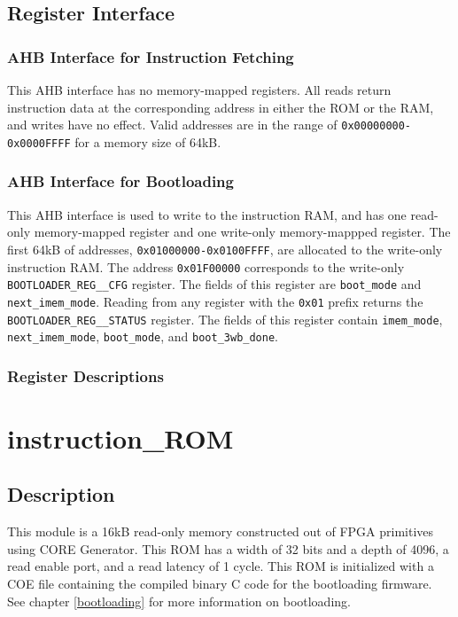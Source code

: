 \subsection{Register Interface}
\subsubsection{AHB Interface for Instruction Fetching}
This AHB interface has no memory-mapped registers. All reads return instruction data at the corresponding address in either the ROM or the RAM, and writes have no effect. Valid addresses are in the range of \texttt{0x00000000-0x0000FFFF} for a memory size of 64kB.

\subsubsection{AHB Interface for Bootloading}
This AHB interface is used to write to the instruction RAM, and has one read-only memory-mapped register and one write-only memory-mappped register. The first 64kB of addresses, \texttt{0x01000000-0x0100FFFF}, are allocated to the write-only instruction RAM. The address \texttt{0x01F00000} corresponds to the write-only \texttt{BOOTLOADER\-\_REG\-\_\_CFG} register. The fields of this register are \texttt{boot\_mode} and \texttt{next\_imem\_mode}. Reading from any register with the \texttt{0x01} prefix returns the \texttt{BOOTLOADER\_REG\_\_STAT\-US} register. The fields of this register contain \texttt{imem\_mode}, \texttt{next\_imem\_mode}, \texttt{boot\-\_mode}, and \texttt{boot\_3wb\_done}.

\subsubsection{Register Descriptions}

\section{instruction\_ROM}
\subsection{Description}
This module is a 16kB read-only memory constructed out of FPGA primitives using CORE Generator. This ROM has a width of 32 bits and a depth of 4096, a read enable port, and a read latency of 1 cycle. This ROM is initialized with a COE file containing the compiled binary C code for the bootloading firmware. See chapter \ref{bootloading} for more information on bootloading.

